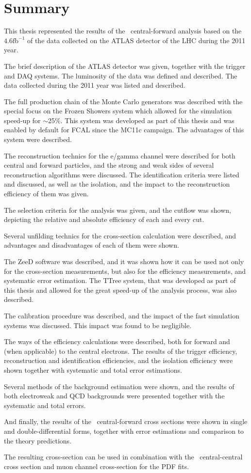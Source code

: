\chapter{Summary}
\label{sec:Summary}

This thesis represented the results of the \Zee\ central-forward analysis based on the $4.6 \mathrm{fb}^{-1}$ of the data collected on the ATLAS detector of the LHC during the 2011 year.

The brief description of the ATLAS detector was given, together with the trigger and DAQ systems. The luminosity of the data was defined and described. The data collected during the 2011 year was listed and described.

The full production chain of the Monte Carlo generators was described with the special focus on the Frozen Showers system which allowed for the simulation speed-up for $\sim$25\%. This system was developed as part of this thesis and was enabled by default for FCAL since the MC11c campaign. The advantages of this system were described.

The reconstruction technics for the e/gamma  channel were described for both central and forward particles, and the strong and weak sides of several reconstruction algorithms were discussed. The identification criteria were listed and discussed, as well as the isolation, and the impact to the reconstruction efficiency of them was given.

The selection criteria for the analysis was given, and the cutflow was shown, depicting the relative and absolute efficiency of each and every cut.

Several unfilding technics for the cross-section calculation were described, and advantages and disadvantages of each of them were shown.

The ZeeD software was described, and it was shown how it can be used not only for the cross-section measurements, but also for the efficiency measurements, and systematic error estimation. The TTree system, that was developed as part of this thesis and allowed for the great speed-up of the analysis process, was also described.

The calibration procedure was described, and the impact of the fast simulation systems was discussed. This impact was found to be negligible.

The ways of the efficiency calculations were described, both for forward and (when applicable) to the central electrons. The results of the trigger efficiency, reconstruction and identification efficiencies, and the isolation efficiency were shown together with systematic and total error estimations.

Several methods of the background estimation were shown, and the results of both electroweak and QCD backgrounds were presented together with the systematic and total errors.

And finally, the results of the \Zee\ central-forward cross sections were shown in single and double-differential forms, together with error estimations and comparison to the theory predictions.

The resulting cross-section can be used in combination with the \Zee\ central-central cross section and muon channel cross-section for the PDF fits.
